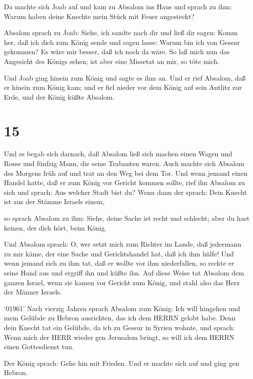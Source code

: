  Da machte sich Joab auf und kam zu Absalom ins Haus und
sprach zu ihm: Warum haben deine Knechte mein Stück mit Feuer
angesteckt?

 Absalom sprach zu Joab: Siehe, ich sandte nach dir und
ließ dir sagen: Komm her, daß ich dich zum König sende und sagen lasse:
Warum bin ich von Gessur gekommen? Es wäre mir besser, daß ich noch da
wäre. So laß mich nun das Angesicht des Königs sehen; ist aber eine
Missetat an mir, so töte mich.

 Und Joab ging hinein zum König und sagte es ihm an. Und er
rief Absalom, daß er hinein zum König kam; und er fiel nieder vor dem
König auf sein Antlitz zur Erde, und der König küßte Absalom.

\hypertarget{section-14}{%
\section{15}\label{section-14}}

 Und es begab sich darnach, daß Absalom ließ sich machen
einen Wagen und Rosse und fünfzig Mann, die seine Trabanten waren.
 Auch machte sich Absalom des Morgens früh auf und trat an
den Weg bei dem Tor. Und wenn jemand einen Handel hatte, daß er zum
König vor Gericht kommen sollte, rief ihn Absalom zu sich und sprach:
Aus welcher Stadt bist du? Wenn dann der sprach: Dein Knecht ist aus der
Stämme Israels einem,

 so sprach Absalom zu ihm: Siehe, deine Sache ist recht und
schlecht; aber du hast keinen, der dich hört, beim König.

 Und Absalom sprach: O, wer setzt mich zum Richter im Lande,
daß jedermann zu mir käme, der eine Sache und Gerichtshandel hat, daß
ich ihm hülfe!  Und wenn jemand sich zu ihm tat, daß er
wollte vor ihm niederfallen, so reckte er seine Hand aus und ergriff ihn
und küßte ihn.  Auf diese Weise tat Absalom dem ganzen
Israel, wenn sie kamen vor Gericht zum König, und stahl also das Herz
der Männer Israels.

 `01961' Nach vierzig Jahren sprach Absalom zum König: Ich
will hingehen und mein Gelübde zu Hebron ausrichten, das ich dem HERRN
gelobt habe.  Denn dein Knecht tat ein Gelübde, da ich zu
Gessur in Syrien wohnte, und sprach: Wenn mich der HERR wieder gen
Jerusalem bringt, so will ich dem HERRN einen Gottesdienst tun.

 Der König sprach: Gehe hin mit Frieden. Und er machte sich
auf und ging gen Hebron.

